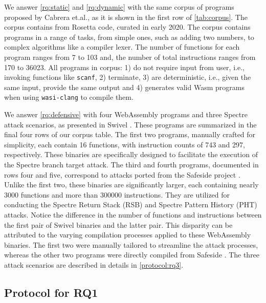 \documentclass[sigplan,screen]{acmart}
\newcommand{\wasm}{Wasm\xspace}
\newcommand{\Wasm}{WebAssembly\xspace}
\newcommand{\etal}{et.al.\xspace}
\newcommand{\ie}{i.e.,\xspace}
\begin{document}
We answer \ref{rq:static} and \ref{rq:dynamic} with the same corpus of programs proposed by Cabrera \etal \cite{arteaga2020crow}, as it is shown in the first row of \autoref{tab:corpus}.
The corpus contains \nProgramsRosetta from Rosetta code, curated in early 2020.
The corpus contains programs in a range of tasks, from simple ones, such as adding two numbers, to complex algorithms like a compiler lexer. 
The number of functions for each program ranges from 7 to 103 and, the number of total instructions ranges from 170 to 36023.
All programs in corpus: 1) do not require input from user, \ie invoking functions like \texttt{scanf}, 2) terminate, 3) are deterministic, \ie given the same input, provide the same output and 4) generates valid \wasm programs when using \texttt{wasi-clang} to compile them.

We answer \ref{rq:defensive} with four \Wasm programs and three Spectre attack scenarios, as presented in Swivel \cite{Swivel}. 
These programs are summarized in the final four rows of our corpus table.
The first two programs, manually crafted for simplicity, each contain 16 functions, with instruction counts of 743 and 297, respectively. These binaries are specifically designed to facilitate the execution of the Spectre branch target attack.
The third and fourth programs, documented in rows four and five, correspond to attacks ported from the Safeside project \cite{safeside}. 
Unlike the first two, these binaries are significantly larger, each containing nearly 3000 functions and more than 300000 instructions. 
They are utilized for conducting the Spectre Return Stack (RSB) and Spectre Pattern History (PHT) attacks.
Notice the difference in the number of functions and instructions between the first pair of Swivel binaries and the latter pair. 
This disparity can be attributed to the varying compilation processes applied to these \Wasm binaries. 
The first two were manually tailored to streamline the attack processes, whereas the other two programs were directly compiled from Safeside \cite{safeside}.
The three attack scenarios are described in details in \autoref{protocol:rq3}.

\subsection{Protocol for RQ1}
\label{protocol:rq1}
\end{document}
